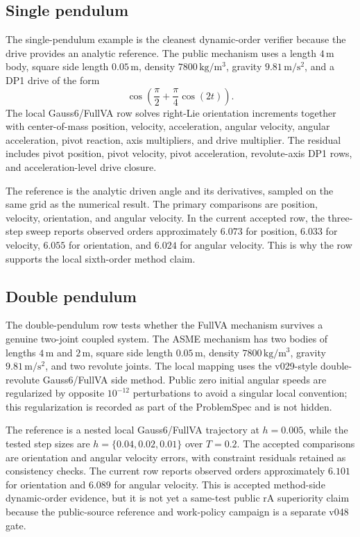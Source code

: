 \documentclass[10pt]{article}
\newcommand{\method}{Gauss6/FullVA}
\begin{document}
\subsection{Single pendulum}

The single-pendulum example is the cleanest dynamic-order verifier because the
drive provides an analytic reference. The public mechanism uses a length
$4\,\mathrm{m}$ body, square side length $0.05\,\mathrm{m}$, density
$7800\,\mathrm{kg/m^3}$, gravity $9.81\,\mathrm{m/s^2}$, and a DP1 drive of
the form
\[
  \cos\!\left(\frac{\pi}{2}+\frac{\pi}{4}\cos(2t)\right).
\]
The local \method{} row solves right-Lie orientation increments together with
center-of-mass position, velocity, acceleration, angular velocity, angular
acceleration, pivot reaction, axis multipliers, and drive multiplier. The
residual includes pivot position, pivot velocity, pivot acceleration,
revolute-axis DP1 rows, and acceleration-level drive closure.

The reference is the analytic driven angle and its derivatives, sampled on
the same grid as the numerical result. The primary comparisons are position,
velocity, orientation, and angular velocity. In the current accepted row, the
three-step sweep reports observed orders approximately $6.073$ for position,
$6.033$ for velocity, $6.055$ for orientation, and $6.024$ for angular
velocity. This is why the row supports the local sixth-order method claim.

\subsection{Double pendulum}

The double-pendulum row tests whether the FullVA mechanism survives a genuine
two-joint coupled system. The ASME mechanism has two bodies of lengths
$4\,\mathrm{m}$ and $2\,\mathrm{m}$, square side length $0.05\,\mathrm{m}$,
density $7800\,\mathrm{kg/m^3}$, gravity $9.81\,\mathrm{m/s^2}$, and two
revolute joints. The local mapping uses the v029-style double-revolute
\method{} side method. Public zero initial angular speeds are regularized by
opposite $10^{-12}$ perturbations to avoid a singular local convention; this
regularization is recorded as part of the ProblemSpec and is not hidden.

The reference is a nested local \method{} trajectory at $h=0.005$, while the
tested step sizes are $h=\{0.04,0.02,0.01\}$ over $T=0.2$. The accepted
comparisons are orientation and angular velocity errors, with constraint
residuals retained as consistency checks. The current row reports observed
orders approximately $6.101$ for orientation and $6.089$ for angular velocity.
This is accepted method-side dynamic-order evidence, but it is not yet a
same-test public rA superiority claim because the public-source reference and
work-policy campaign is a separate v048 gate.
\end{document}
